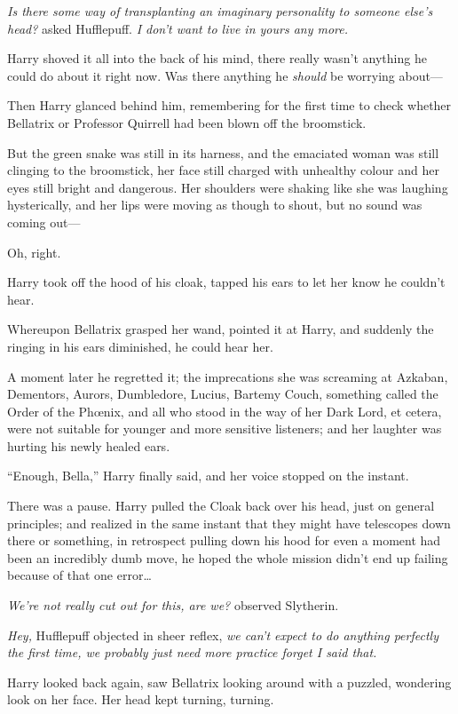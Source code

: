 \emph{Is there some way of transplanting an imaginary personality to someone else’s head?} asked Hufflepuff. \emph{I don’t want to live in yours any more.}

Harry shoved it all into the back of his mind, there really wasn’t anything he could do about it right now. Was there anything he \emph{should} be worrying about—

Then Harry glanced behind him, remembering for the first time to check whether Bellatrix or Professor Quirrell had been blown off the broomstick.

But the green snake was still in its harness, and the emaciated woman was still clinging to the broomstick, her face still charged with unhealthy colour and her eyes still bright and dangerous. Her shoulders were shaking like she was laughing hysterically, and her lips were moving as though to shout, but no sound was coming out—

Oh, right.

Harry took off the hood of his cloak, tapped his ears to let her know he couldn’t hear.

Whereupon Bellatrix grasped her wand, pointed it at Harry, and suddenly the ringing in his ears diminished, he could hear her.

A moment later he regretted it; the imprecations she was screaming at Azkaban, Dementors, Aurors, Dumbledore, Lucius, Bartemy Couch, something called the Order of the Phœnix, and all who stood in the way of her Dark Lord, et cetera, were not suitable for younger and more sensitive listeners; and her laughter was hurting his newly healed ears.

“Enough, Bella,” Harry finally said, and her voice stopped on the instant.

There was a pause. Harry pulled the Cloak back over his head, just on general principles; and realized in the same instant that they might have telescopes down there or something, in retrospect pulling down his hood for even a moment had been an incredibly dumb move, he hoped the whole mission didn’t end up failing because of that one error…

\emph{We’re not really cut out for this, are we?} observed Slytherin.

\emph{Hey,} Hufflepuff objected in sheer reflex, \emph{we can’t expect to do anything perfectly the first time, we probably just need more practice \emph{forget I said that}.}

Harry looked back again, saw Bellatrix looking around with a puzzled, wondering look on her face. Her head kept turning, turning.

